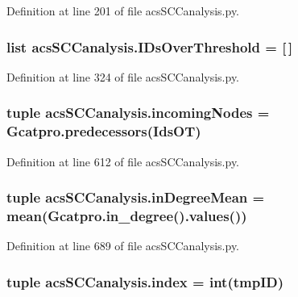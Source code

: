 Definition at line 201 of file acs\-S\-C\-Canalysis.\-py.

\hypertarget{a00097_a578f0f0f1e87579d73b11f8720610b1e}{
\subsubsection[{I\-Ds\-Over\-Threshold}]{\setlength{\rightskip}{0pt plus 5cm}list acs\-S\-C\-Canalysis.\-I\-Ds\-Over\-Threshold = \mbox{[}$\,$\mbox{]}}}\label{a00097_a578f0f0f1e87579d73b11f8720610b1e}


Definition at line 324 of file acs\-S\-C\-Canalysis.\-py.

\hypertarget{a00097_a540ba5319ee67d8a2323099dad73ba36}{
\subsubsection[{incoming\-Nodes}]{\setlength{\rightskip}{0pt plus 5cm}tuple acs\-S\-C\-Canalysis.\-incoming\-Nodes = Gcatpro.\-predecessors(Ids\-O\-T)}}\label{a00097_a540ba5319ee67d8a2323099dad73ba36}


Definition at line 612 of file acs\-S\-C\-Canalysis.\-py.

\hypertarget{a00097_a5004d18b8cfa2803620a9cd7f32d9775}{
\subsubsection[{in\-Degree\-Mean}]{\setlength{\rightskip}{0pt plus 5cm}tuple acs\-S\-C\-Canalysis.\-in\-Degree\-Mean = mean(Gcatpro.\-in\-\_\-degree().values())}}\label{a00097_a5004d18b8cfa2803620a9cd7f32d9775}


Definition at line 689 of file acs\-S\-C\-Canalysis.\-py.

\hypertarget{a00097_aaac3bb67a998c4a09aeed8f1adec2f9c}{
\subsubsection[{index}]{\setlength{\rightskip}{0pt plus 5cm}tuple acs\-S\-C\-Canalysis.\-index = int(tmp\-I\-D)}}\label{a00097_aaac3bb67a998c4a09aeed8f1adec2f9c}


